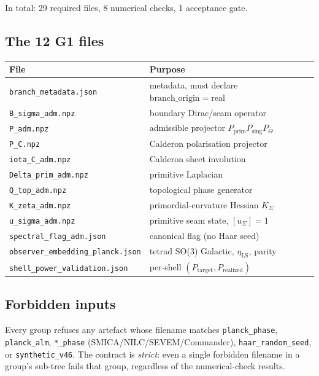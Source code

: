 \documentclass[11pt,a4paper]{article}
\begin{document}
In total: 29 required files, 8 numerical checks, 1 acceptance gate.

\subsection{The 12 G1 files}

\begin{center}
\small
\begin{tabular}{ll}
\toprule
File & Purpose \\
\midrule
\texttt{branch\_metadata.json}        & metadata, must declare \(\mathrm{branch\_origin}=\mathrm{real}\) \\
\texttt{B\_sigma\_adm.npz}            & boundary Dirac/seam operator \\
\texttt{P\_adm.npz}                   & admissible projector \(P_{\mathrm{prim}}P_{\mathrm{sing}}P_\Theta\) \\
\texttt{P\_C.npz}                     & Calderon polarisation projector \\
\texttt{iota\_C\_adm.npz}             & Calderon sheet involution \\
\texttt{Delta\_prim\_adm.npz}         & primitive Laplacian \\
\texttt{Q\_top\_adm.npz}              & topological phase generator \\
\texttt{K\_zeta\_adm.npz}             & primordial-curvature Hessian \(K_\Sigma\) \\
\texttt{u\_sigma\_adm.npz}            & primitive seam state, \([u_\Sigma]=1\) \\
\texttt{spectral\_flag\_adm.json}     & canonical flag (no Haar seed) \\
\texttt{observer\_embedding\_planck.json} & tetrad SO(3) Galactic, \(\eta_{\mathrm{LS}}\), parity \\
\texttt{shell\_power\_validation.json} & per-shell \((P_{\mathrm{target}},P_{\mathrm{realized}})\) \\
\bottomrule
\end{tabular}
\end{center}

\subsection{Forbidden inputs}

Every group refuses any artefact whose filename matches
\texttt{planck\_phase}, \texttt{planck\_alm}, \texttt{*\_phase}
(SMICA/NILC/SEVEM/Commander), \texttt{haar\_random\_seed}, or
\texttt{synthetic\_v46}.  The contract is \emph{strict}: even a single
forbidden filename in a group's sub-tree fails that group, regardless
of the numerical-check results.
\end{document}
